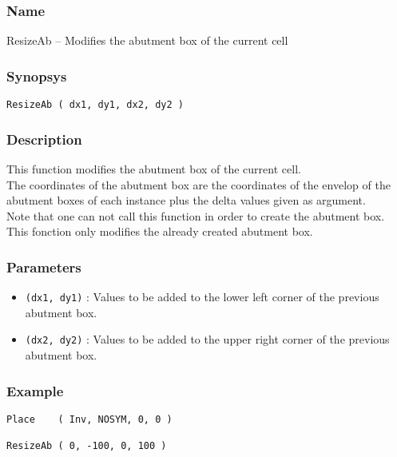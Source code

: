 \subsubsection{Name}

ResizeAb -- Modifies the abutment box of the current cell

\subsubsection{Synopsys}

\begin{verbatim}
ResizeAb ( dx1, dy1, dx2, dy2 )
\end{verbatim}

\subsubsection{Description}

This function modifies the abutment box of the current cell.\\
\indent The coordinates of the abutment box are the coordinates of the envelop of the abutment boxes of each instance plus the delta values given as argument.\\

\indent Note that one can not call this function in order to create the abutment box. This fonction only modifies the already created abutment box.
    
\subsubsection{Parameters}

\begin{itemize}
    \item \verb-(dx1, dy1)- : Values to be added to the lower left corner of the previous abutment box.
    \item \verb-(dx2, dy2)- : Values to be added to the upper right corner of the previous abutment box.
\end{itemize}
      
\subsubsection{Example}

\begin{verbatim}
Place    ( Inv, NOSYM, 0, 0 )
    
ResizeAb ( 0, -100, 0, 100 )           
\end{verbatim}

